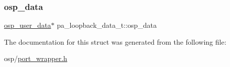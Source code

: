 \subsubsection{\texorpdfstring{osp\+\_\+data}{osp\_data}}
{\footnotesize\ttfamily \mbox{\hyperlink{constants_8h_a2d1d78531fe12807c3852488556d5a4b}{osp\+\_\+user\+\_\+data}}$\ast$ pa\+\_\+loopback\+\_\+data\+\_\+t\+::osp\+\_\+data}



The documentation for this struct was generated from the following file\+:\begin{DoxyCompactItemize}
\item 
osp/\mbox{\hyperlink{port__wrapper_8h}{port\+\_\+wrapper.\+h}}\end{DoxyCompactItemize}
